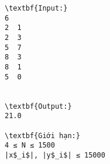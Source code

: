 \begin{verbatim}
\textbf{Input:}
6
2  1
2  3
5  7
8  3
8  1
5  0


\textbf{Output:}
21.0

\textbf{Giới hạn:}
4 ≤ N ≤ 1500 
|x$_i$|, |y$_i$| ≤ 15000 
\end{verbatim}